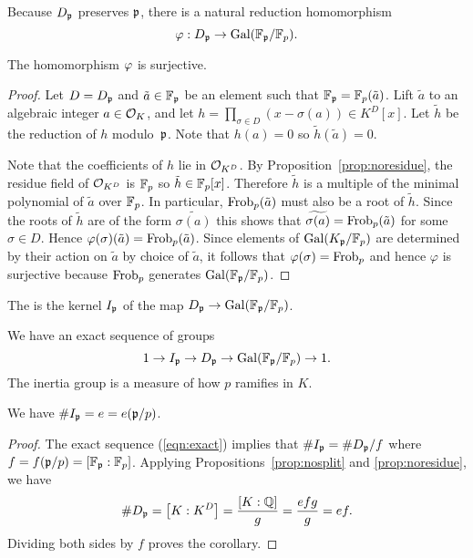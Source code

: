 Because $D_{\mathfrak{p}}$ preserves $\mathfrak{p}$, there is a natural reduction homomorphism
$$
	\varphi:D_{\mathfrak{p}} \to \operatorname{Gal}(\mathbb{F}_{\mathfrak{p}}/\mathbb{F}_p).
$$
\begin{theorem}\label{thm:redsurj}
	The homomorphism $\varphi$ is surjective.
\end{theorem}
\begin{proof}
	Let $D = D_{\mathfrak{p}}$ and $\tilde{a} \in \mathbb{F}_{\mathfrak{p}}$ be an element
	such that $\mathbb{F}_{\mathfrak{p}} = \mathbb{F}_p(\tilde{a})$.
	Lift $\tilde{a}$ to an algebraic integer $a\in \mathcal{O}_K$, and let
	$h = \prod_{\sigma \in D}(x-\sigma(a))\in K^D[x]$.
	Let $\tilde{h}$ be the reduction of $h$ modulo~$\mathfrak{p}$.
	Note that $h(a) = 0$ so $\tilde{h}(\tilde{a}) = 0$.
	
	Note that the coefficients of $h$ lie in $\mathcal{O}_{K^D}$.
	By Proposition~\ref{prop:noresidue}, the residue field of $\mathcal{O}_{K^D}$
	is $\mathbb{F}_p$ so $\tilde{h}\in\mathbb{F}_p[x]$.
	Therefore $\tilde{h}$ is a multiple of the minimal polynomial of
	$\tilde{a}$ over $\mathbb{F}_p$. In particular, $\operatorname{Frob}_p(\tilde{a})$
	must also be a root of $\tilde{h}$.
	Since the roots of $\tilde{h}$ are of the form $\widetilde{\sigma(a)}$
	this shows that $\widetilde{\sigma(a)} = \operatorname{Frob}_p(\tilde{a})$
	for some $\sigma\in D$.
	Hence $\varphi(\sigma)(\tilde{a}) = \operatorname{Frob}_p(\tilde{a})$. Since elements
	of $\operatorname{Gal}(K_{\mathfrak{p}}/\mathbb{F}_p)$ are determined by their action on $\tilde{a}$
	by choice of $\tilde{a}$, it follows that $\varphi(\sigma) = \operatorname{Frob}_p$
	and hence $\varphi$ is surjective because $\operatorname{Frob}_p$
	generates $\operatorname{Gal}(\mathbb{F}_{\mathfrak{p}}/\mathbb{F}_p)$.
\end{proof}

\begin{definition}
	The 
	is the kernel $I_{\mathfrak{p}}$ of the map $D_{\mathfrak{p}}\to\operatorname{Gal}(\mathbb{F}_{\mathfrak{p}}/\mathbb{F}_p)$.
\end{definition}
We have an exact sequence of groups
\begin{equation}\label{eqn:exact}
	1 \to I_{\mathfrak{p}} \to D_{\mathfrak{p}} \to \operatorname{Gal}(\mathbb{F}_{\mathfrak{p}}/\mathbb{F}_p)\to 1.
\end{equation}
The inertia group is a measure of how $p$ ramifies in $K$.
\begin{corollary}
	We have $\# I_{\mathfrak{p}} = e = e(\mathfrak{p}/p)$.
\end{corollary}
\begin{proof}
	The exact sequence (\ref{eqn:exact}) implies that
	$\#I_{\mathfrak{p}} = \#D_{\mathfrak{p}} / f$ where $f = f(\mathfrak{p}/p) = [\mathbb{F}_{\mathfrak{p}} : \mathbb{F}_p]$.
	Applying Propositions~\ref{prop:nosplit} and \ref{prop:noresidue}, we have
	$$
		\#D_{\mathfrak{p}} = \left[K : K^D\right] = \frac{[K:\mathbb{Q}]}{g} = \frac{efg}{g} = ef.
	$$
	Dividing both sides by $f$ proves the corollary.
\end{proof}

